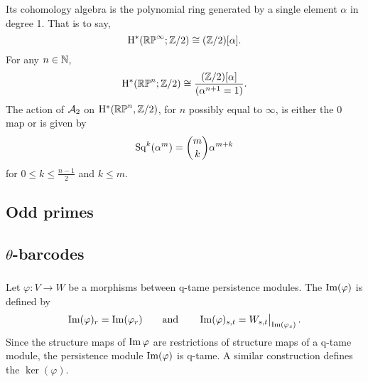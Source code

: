Its cohomology algebra is the polynomial ring generated by a single element $\alpha$ in degree 1.
That is to say,
\[
\mathrm{H}^\ast(\mathbb{RP}^\infty; \mathbb{Z}/2) \cong (\mathbb{Z}/2)[\alpha].
\]
For any $n \in \mathbb{N}$,
\[
\mathrm{H}^\ast(\mathbb{RP}^n; \mathbb{Z}/2) \cong \frac{(\mathbb{Z}/2)[\alpha]}{(\alpha^{n+1} = 1)}.
\]
The action of $\mathcal{A}_2$ on $\mathrm{H}^*(\mathbb{RP}^n, \mathbb{Z}/2)$, for $n$ possibly equal to $\infty$, is either the 0 map or is given by
\[
\operatorname{Sq}^k(\alpha^m) = \binom{m}{k}\alpha^{m+k}
\]
for $0 \leq k \leq \frac{n-1}{2}$ and $k \leq m$.


\subsection{Odd primes}


\subsection{$\theta$-barcodes}

\subsubsection{} Let $\varphi \colon V \to W$ be a morphisms between q-tame persistence modules.
The  $\operatorname{Im}(\varphi)$ is defined by
\[
\operatorname{Im}(\varphi)_r = \operatorname{Im}(\varphi_r)
\qquad\text{and}\qquad
\operatorname{Im}(\varphi)_{s,t} = W_{s,t}\big|_{\operatorname{Im}(\varphi_s)}\,.
\]
Since the structure maps of $\operatorname{Im} \varphi$ are restrictions of structure maps of a q-tame module, the persistence module $\operatorname{Im}(\varphi)$ is q-tame.
A similar construction defines the  $\ker(\varphi)$.

